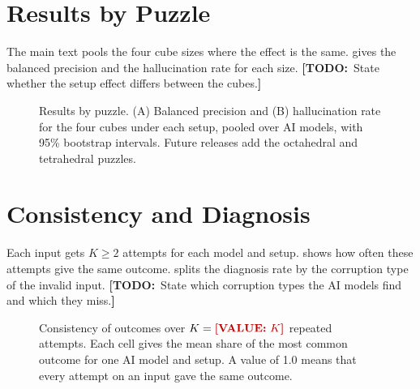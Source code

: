 \documentclass[10pt,twocolumn,letterpaper]{article}
\newcommand{\todo}[1]{{\color{red!70!black}\textbf{[TODO:}~#1\textbf{]}}}
\newcommand{\val}[1]{{\color{red!70!black}\textbf{[VALUE:}~#1\textbf{]}}}
\begin{document}
\section{Results by Puzzle}\label{app:puzzle}
The main text pools the four cube sizes where the effect is the same.  gives the balanced precision and the hallucination rate for each size. \todo{State whether the setup effect differs between the cubes.}

\begin{figure}[t]
\begin{phcanvas}
\end{phcanvas}
\caption{Results by puzzle. (A) Balanced precision and (B) hallucination rate for the four cubes under each setup, pooled over AI models, with 95\% bootstrap intervals. Future releases add the octahedral and tetrahedral puzzles.}
\label{fig:per-puzzle}
\end{figure}

\section{Consistency and Diagnosis}\label{app:consistency}
Each input gets $K \geq 2$ attempts for each model and setup.  shows how often these attempts give the same outcome.  splits the diagnosis rate by the corruption type of the invalid input. \todo{State which corruption types the AI models find and which they miss.}

\begin{figure}[t]
\caption{Consistency of outcomes over $K = \val{K}$ repeated attempts. Each cell gives the mean share of the most common outcome for one AI model and setup. A value of 1.0 means that every attempt on an input gave the same outcome.}
\label{fig:consistency}
\end{figure}
\end{document}
